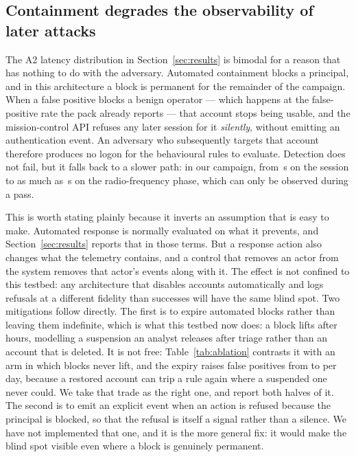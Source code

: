 \subsection{Containment degrades the observability of later attacks}

The A2 latency distribution in Section~\ref{sec:results} is bimodal for a reason
that has nothing to do with the adversary. Automated containment blocks a
principal, and in this architecture a block is permanent for the remainder of the
campaign. When a false positive blocks a benign operator --- which happens at the
false-positive rate the pack already reports --- that account stops being usable,
and the mission-control API refuses any later session for it \emph{silently},
without emitting an authentication event. An adversary who subsequently targets
that account therefore produces no logon for the behavioural rules to evaluate.
Detection does not fail, but it falls back to a slower path: in our campaign,
from \ResTTDMedianAtwo{}\,s on the session to as much as \ResTTDMaxAtwo{}\,s on
the radio-frequency phase, which can only be observed during a pass.

This is worth stating plainly because it inverts an assumption that is easy to
make. Automated response is normally evaluated on what it prevents, and
Section~\ref{sec:results} reports that in those terms. But a response action also
changes what the telemetry contains, and a control that removes an actor from the
system removes that actor's events along with it. The effect is not confined to
this testbed: any architecture that disables accounts automatically and logs
refusals at a different fidelity than successes will have the same blind spot.
Two mitigations follow directly. The first is to expire automated blocks rather
than leaving them indefinite, which is what this testbed now does: a block lifts
after \BlockTTLHours{} hours, modelling a suspension an analyst releases after
triage rather than an account that is deleted. It is not free:
Table~\ref{tab:ablation} contrasts it with an arm in which blocks never lift, and
the expiry raises false positives from \AblNoExpiryFP{} to \AblFullFP{} per day,
because a restored account can trip a rule again where a suspended one never
could. We take that trade as the right one, and report both halves of it. The
second is to emit an explicit event when an action is refused because the
principal is blocked, so that the refusal is itself a signal rather than a
silence. We have not implemented that one, and it is the more general fix: it
would make the blind spot visible even where a block is genuinely permanent.

